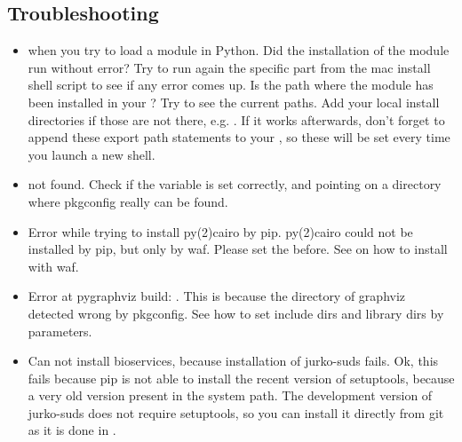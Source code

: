 \documentclass[letterpaper,10pt,english]{sphinxmanual}
\begin{document}
\subsection{Troubleshooting}
\label{\detokenize{index:troubleshooting}}\begin{itemize}
\item {} 
 when you try to load a module in Python. Did
the installation of the module run without error? Try to run again the specific
part from the mac install shell script to see if any error comes up. Is the
path where the module has been installed in your ? Try  to see the current paths. Add your local install directories if
those are not there, e.g.
.
If it works afterwards, don’t forget to append these export path statements to
your , so these will be set every time you launch a new
shell.

\item {} 
 not found. Check if the  variable is
set correctly, and pointing on a directory where pkgconfig really can be
found.

\item {} 
Error while trying to install py(2)cairo by pip. py(2)cairo could not be
installed by pip, but only by waf. Please set the  before.
See  on how to install with waf.

\item {} 
Error at pygraphviz build: . This is
because the directory of graphviz detected wrong by pkgconfig. See
 how to set include dirs and library dirs by
 parameters.

\item {} 
Can not install bioservices, because installation of jurko-suds fails. Ok,
this fails because pip is not able to install the recent version of
setuptools, because a very old version present in the system path. The
development version of jurko-suds does not require setuptools, so you can
install it directly from git as it is done in .


\end{itemize}
\end{document}
